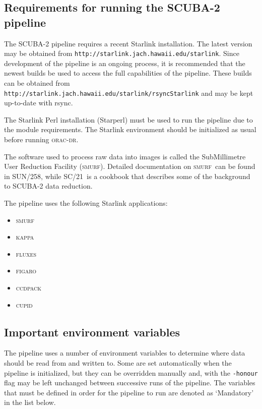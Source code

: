 \documentclass[twoside,11pt]{article}
\newcommand{\htmladdnormallink}[2]{#1}
\newcommand{\xref}[3]{#1}
\renewcommand{\_}{\texttt{\symbol{95}}}
\newcommand{\CCDPACK}{\textsc{ccdpack}}
\newcommand{\CUPID}{\textsc{cupid}}
\newcommand{\FIGARO}{\textsc{figaro}}
\newcommand{\FLUXES}{\textsc{fluxes}}
\newcommand{\KAPPA}{\textsc{kappa}}
\newcommand{\SMURF}{\textsc{smurf}}
\newcommand{\SMURFcook}{\xref{SC/21}{sc21}{}}
\newcommand{\SMURFsun}{\xref{SUN/258}{sun258}{}}
\newcommand{\oracdr}{\textsc{orac-dr}}
\begin{document}
\subsection{Requirements for running the SCUBA-2 pipeline}

The SCUBA-2 pipeline requires a recent Starlink installation. The
latest version may be obtained from
\htmladdnormallink{\texttt{http://starlink.jach.hawaii.edu/starlink}}{http://starlink.jach.hawaii.edu/starlink}. Since
development of the pipeline is an ongoing process, it is recommended
that the newest builds be used to access the full capabilities of the
pipeline. These builds can be obtained from\\
\htmladdnormallink{\texttt{http://starlink.jach.hawaii.edu/starlink/rsyncStarlink}}{http://starlink.jach.hawaii.edu/starlink/rsyncStarlink}
and may be kept up-to-date with rsync.

The Starlink Perl installation (Starperl) must be used to run the
pipeline due to the module requirements. The Starlink environment should be
initialized as usual before running \oracdr.

The software used to process raw data into images is called the
SubMillimetre User Reduction Facility (\SMURF). Detailed documentation
on \SMURF\ can be found in \SMURFsun, while \SMURFcook\ is a cookbook
that describes some of the background to SCUBA-2 data reduction.

The pipeline uses the following Starlink applications:
\begin{itemize}
\item \SMURF
\item \KAPPA
\item \FLUXES
\item \FIGARO
\item \CCDPACK
\item \CUPID
\end{itemize}

\subsection{Important environment variables}

The pipeline uses a number of environment variables to determine where
data should be read from and written to. Some are set automatically
when the pipeline is initialized, but they can be overridden manually
and, with the \verb+-honour+ flag may be left unchanged between
successive runs of the pipeline. The variables that must be defined in
order for the pipeline to run are denoted as `Mandatory' in the list
below.
\end{document}
